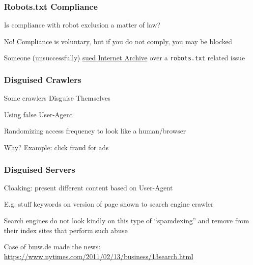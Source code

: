 \documentclass{beamer}
\begin{document}




 









 
\begin{frame} \frametitle{Robots.txt Compliance}

\begin{block}{Is compliance with robot exclusion a matter of law? }

No! Compliance is voluntary, but if you do not comply, you may be blocked

Someone (unsuccessfully) \href{http://www.theregister.co.uk/2007/07/26/wayback_firm_suit/}{sued Internet Archive} over a {\tt robots.txt} related issue

\end{block}
\end{frame}


\begin{frame} \frametitle{Disguised Crawlers}

\begin{block}{Some crawlers Disguise Themselves}

Using false User-Agent 

Randomizing access frequency to look like a human/browser

Why? Example: click fraud for ads

\end{block}

\end{frame}

\begin{frame} \frametitle{Disguised Servers}

\begin{block}{Cloaking:} 
present different content based on User-Agent

E.g. stuff keywords on version of page shown to search engine crawler
\end{block}

Search engines do not look kindly on this type of ``spamdexing'' and remove from their index sites that perform such abuse

\vfill

Case of bmw.de made the news: \url{https://www.nytimes.com/2011/02/13/business/13search.html}
\end{frame}
\end{document}
